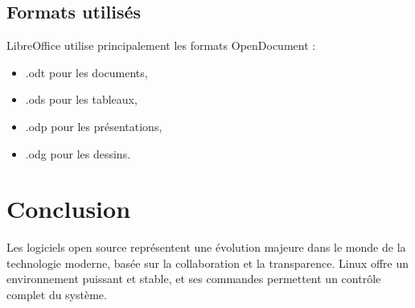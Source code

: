 \documentclass[12pt,a4paper]{report}
\begin{document}
\section{Formats utilisés}

LibreOffice utilise principalement les formats OpenDocument :
\begin{itemize}
    \item .odt pour les documents,
    \item .ods pour les tableaux,
    \item .odp pour les présentations,
    \item .odg pour les dessins.
\end{itemize}
\chapter*{Conclusion}

Les logiciels open source représentent une évolution majeure dans le monde de la technologie moderne, basée sur la collaboration et la transparence.  
Linux offre un environnement puissant et stable, et ses commandes permettent un contrôle complet du système.

\end{document}
